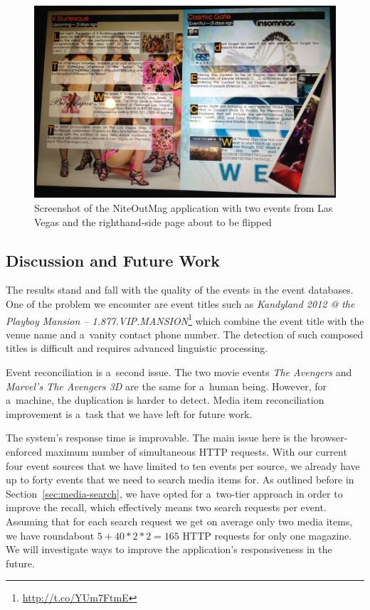 \documentclass[runningheads,a4paper]{llncs}
\begin{document}
{\begin{figure}[b!]
\centering
\includegraphics[width=1.0\columnwidth]{./screenshot.jpg}
\caption{Screenshot of the NiteOutMag application with two events from Las Vegas and the righthand-side page about to be flipped}
\label{fig:screenshot}
\end{figure}

\subsection{Discussion and Future Work}
The results stand and fall with the quality of the events in the event databases. One of the problem we encounter are event titles such as
\emph{Kandyland 2012 @ the Playboy Mansion -- 1.877.VIP.MANSION}\footnote{\url{http://t.co/YUm7FtmE}} which combine the event title with the venue name
and a~vanity contact phone number. The detection of such composed titles is difficult and requires advanced linguistic processing.

Event reconciliation is a~second issue. The two movie events \emph{The Avengers} and \emph{Marvel's The Avengers 3D} are the same for a~human being. However, for a~machine, the duplication is harder to detect. Media item reconciliation improvement is a~task that we have left for future work.

The system's response time is improvable. The main issue here is the browser-enforced maximum number of simultaneous HTTP requests. With our current four event sources that we have limited to ten events per source, we already have up to forty events that we need to search media items for. As outlined before in Section~\ref{sec:media-search}, we have opted for a~two-tier approach in order to improve the recall, which effectively means two search requests per event.
Assuming that for each search request we get on average only two media items, we have roundabout $5+40*2*2=165$ HTTP requests for only one magazine. We will investigate ways to improve the application's responsiveness in the future.

}
\end{document}

